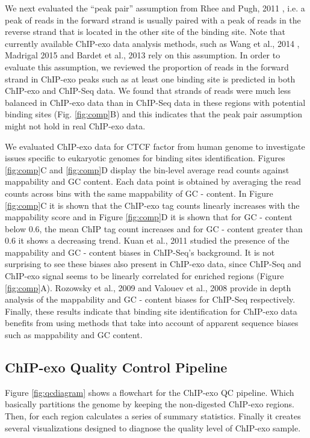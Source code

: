 \documentclass{bmcart}\usepackage[]{graphicx}\usepackage[]{color}
\begin{document}
We next evaluated the ``peak pair'' assumption from Rhee and Pugh,
2011 \cite{exo1}, i.e. a peak of reads in the forward strand is
usually paired with a peak of reads in the reverse strand that is
located in the other site of the binding site. Note that currently
available ChIP-exo data analysis methods, such as Wang et al., 2014
\cite{mace}, Madrigal 2015 \cite{cexor} and Bardet et al., 2013
\cite{peakzilla} rely on this assumption. In order to evaluate this
assumption, we reviewed the proportion of reads in the forward strand
in ChIP-exo peaks such as at least one binding site is predicted in
both ChIP-exo and ChIP-Seq data. We found that strands of reads were
much less balanced in ChIP-exo data than in ChIP-Seq data in these
regions with potential binding sites (Fig. \ref{fig:comp}B) and this
indicates that the peak pair assumption might not hold in real
ChIP-exo data.

We evaluated ChIP-exo data for CTCF factor from human genome
\cite{exo1} to investigate issues specific to eukaryotic genomes for
binding sites identification. Figures \ref{fig:comp}C and
\ref{fig:comp}D display the bin-level average read counts against
mappability and GC content. Each data point is obtained by averaging
the read counts across bins with the same mappability of GC -
content. In Figure \ref{fig:comp}C it is shown that the ChIP-exo tag
counts linearly increases with the mappability score and in Figure
\ref{fig:comp}D it is shown that for GC - content below 0.6, the mean
ChIP tag count increases and for GC - content greater than 0.6 it
shows a decreasing trend. Kuan et al., 2011 \cite{mosaics} studied the
presence of the mappability and GC - content biases in ChIP-Seq's
background. It is not surprising to see these biases also present in
ChIP-exo data, since ChIP-Seq and ChIP-exo signal seems to be linearly
correlated for enriched regions (Figure \ref{fig:comp}A). Rozowsky et
al., 2009 \cite{peakseq} and Valouev et al., 2008 \cite{quest} provide
in depth analysis of the mappability and GC - content biases for
ChIP-Seq respectively. Finally, these results indicate that binding
site identification for ChIP-exo data benefits from using methods that
take into account of apparent sequence biases such as mappability and
GC content.

\subsection{ChIP-exo Quality Control Pipeline}

Figure \ref{fig:qcdiagram} shows a flowchart for the ChIP-exo QC
pipeline. Which basically partitions the genome by keeping the
non-digested ChIP-exo regions. Then, for each region calculates a
series of summary statistics. Finally it creates several
visualizations designed to diagnose the quality level of ChIP-exo
sample.
\end{document}
